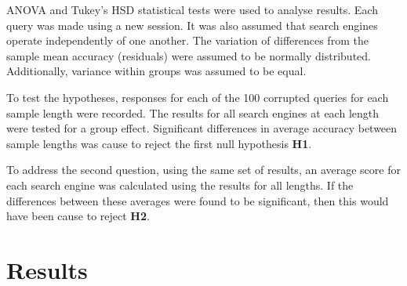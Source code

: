 \documentclass{csfourzero}
\begin{document}
ANOVA and Tukey's HSD statistical tests were used to analyse results. Each query was made using a new session. It was also assumed that search engines operate independently of one another. The variation of differences from the sample mean accuracy (residuals) were assumed to be normally distributed. Additionally, variance within groups was assumed to be equal.

To test the hypotheses, responses for each of the 100 corrupted queries for each sample length were recorded. The results for all search engines at each length were tested for a group effect. Significant differences in average accuracy between sample lengths was cause to reject the first null hypothesis \textbf{H1}.

To address the second question, using the same set of results, an average score for each search engine was calculated using the results for all lengths. If the differences between these averages were found to be significant, then this would have been cause to reject \textbf{H2}.

\section{Results}
\label{sec:results}
\end{document}
